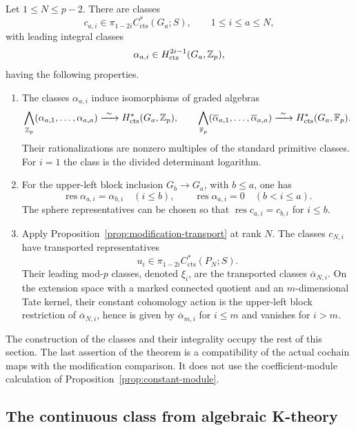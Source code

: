 \begin{theorem}\label{thm:stable-generators}
Let $1\leq N\leq p-2$.  There are classes
\[
 c_{a,i}\in
 \pi_{1-2i}C^*_{\mathrm{cts}}(G_a;S),
 \qquad 1\leq i\leq a\leq N,
\]
with leading integral classes
\[
 \alpha_{a,i}\in H^{2i-1}_{\mathrm{cts}}(G_a,\mathbb Z_p),
\]
having the following properties.
\begin{enumerate}
\item The classes $\alpha_{a,i}$ induce isomorphisms of graded algebras
\[
 \bigwedge_{\mathbb Z_p}(\alpha_{a,1},\ldots,\alpha_{a,a})
 \xrightarrow{\ \sim\ } H^*_{\mathrm{cts}}(G_a,\mathbb Z_p),
 \qquad
 \bigwedge_{\mathbb F_p}(\overline\alpha_{a,1},\ldots,
                  \overline\alpha_{a,a})
 \xrightarrow{\ \sim\ } H^*_{\mathrm{cts}}(G_a,\mathbb F_p).
\]
Their rationalizations are nonzero multiples of the standard primitive
classes.  For $i=1$ the class is the divided determinant logarithm.
\item For the upper-left block inclusion $G_b\longrightarrow G_a$,
with $b\leq a$, one has
\[
 \operatorname{res}\alpha_{a,i}=\alpha_{b,i}\quad(i\leq b),
 \qquad
 \operatorname{res}\alpha_{a,i}=0\quad(b<i\leq a).
\]
The sphere representatives can be chosen so that
$\operatorname{res}c_{a,i}=c_{b,i}$ for $i\leq b$.
\item Apply Proposition~\ref{prop:modification-transport} at rank $N$.
The classes $c_{N,i}$ have transported representatives
\[
 u_i\in\pi_{1-2i}C^*_{\mathrm{cts}}(P_N;S).
\]
Their leading mod-$p$ classes, denoted $\xi_i$, are the transported
classes $\overline\alpha_{N,i}$.  On the extension space with a marked
connected quotient and an $m$-dimensional Tate kernel, their constant
cohomology action is the upper-left block restriction of
$\overline\alpha_{N,i}$, hence is given by
$\overline\alpha_{m,i}$ for $i\leq m$ and vanishes for $i>m$.
\end{enumerate}
\end{theorem}

The construction of the classes and their integrality occupy the rest
of this section.  The last assertion of the theorem is a compatibility
of the actual cochain maps with the modification comparison.  It does
not use the coefficient-module calculation of
Proposition~\ref{prop:constant-module}.

\subsection{The continuous class from algebraic K-theory}
\label{gen:continuous-k-section}

